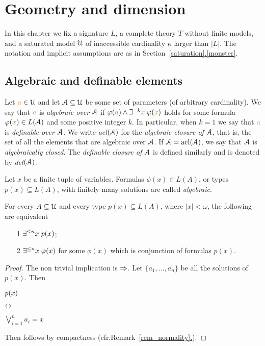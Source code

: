 \chapter{Geometry and dimension}\label{geometria}



\def\medrel#1{\parbox[t]{5ex}{$\displaystyle\hfil #1$}}
\def\ceq#1#2#3{\parbox{35ex}{$\displaystyle #1$}\medrel{#2}$\displaystyle  #3$}

In this chapter we fix a signature $L$, a complete theory $T$ without finite models, and a saturated model $\EuScript U$ of inaccessible cardinality $\kappa$ larger than $|L|$.
The notation and implicit assumptions are as in Section~\hyperref[monster]{\ref*{saturation}.\ref*{monster}}.


\section{Algebraic and definable elements}\label{acl}

Let ${\color{brown} a}\in\EuScript U$ and let $\EuScript A\subseteq\EuScript U$ be some set of parameters (of arbitrary cardinality).
We say that ${\color{brown} a}$ is \emph{algebraic over $\EuScript A$\/} if $\varphi({\color{brown} a})\wedge\exists^{=k}{\color{brown} x}\;\varphi({\color{brown} x})$ holds for some  formula $\varphi({\color{brown} x})\in L(\EuScript A)$ and  some positive integer $k$.
In particular, when $k=1$ we say that ${\color{brown} a}$ is \emph{definable over $\EuScript A$}.
We write \emph{acl$(\EuScript A)$} for the \emph{algebraic closure of $\EuScript A$}, that is, the set of all the elements that are algebraic over $\EuScript A$.
If $\EuScript A=\mathop{\rm acl}(\EuScript A)$, we say that $\EuScript A$ is \emph{algebraically closed}.
The \emph{definable closure of $\EuScript A$\/} is defined similarly and is denoted by \emph{dcl$(\EuScript A)$}.


Let $x$ be a finite tuple of variables.
Formulas $\phi(x)\in L(A)$, or types $p(x)\subseteq L(A)$, with finitely many solutions are called \emph{algebraic}.

\begin{proposition}\label{prop_tipialgebrici}
For every $A\subseteq\EuScript U$ and every type $p(x)\subseteq L(A)$, where $|x|<\omega$, the following are equivalent
\begin{itemize} 
\item[1] $\exists^{\le n}x\; p(x)$;
\item[2] $\exists^{\le n}x\;\varphi(x)$ for some $\phi(x)$ which is conjunction of formulas $p(x)$.
\end{itemize}
\end{proposition}
\begin{proof} The non trivial implication is $\Rightarrow$.
Let $\{a_1,\dots,a_n\}$ be all the solutions of $p(x)$.
Then 

\ceq{\hfill p(x)}{\iff}{\bigvee^n_{i=1}a_i=x}

Then  follows by compactness (cfr.\@ Remark~\hyperref[rem_normality]{\ref*{rem_normality}.}).
\end{proof}

